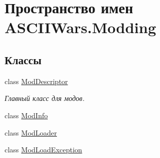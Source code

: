 \hypertarget{namespace_a_s_c_i_i_wars_1_1_modding}{}\section{Пространство имен A\+S\+C\+I\+I\+Wars.\+Modding}
\label{namespace_a_s_c_i_i_wars_1_1_modding}
\subsection*{Классы}
\begin{DoxyCompactItemize}
\item 
class \hyperlink{class_a_s_c_i_i_wars_1_1_modding_1_1_mod_descriptor}{Mod\+Descriptor}
\begin{DoxyCompactList}\small\item\em Главный класс для модов. \end{DoxyCompactList}\item 
class \hyperlink{class_a_s_c_i_i_wars_1_1_modding_1_1_mod_info}{Mod\+Info}
\item 
class \hyperlink{class_a_s_c_i_i_wars_1_1_modding_1_1_mod_loader}{Mod\+Loader}
\item 
class \hyperlink{class_a_s_c_i_i_wars_1_1_modding_1_1_mod_load_exception}{Mod\+Load\+Exception}
\end{DoxyCompactItemize}
